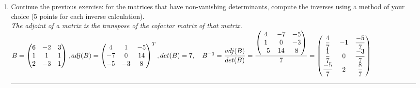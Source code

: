 \documentclass[fleqn]{article}
\begin{document}
\begin{enumerate}
  \item Continue the previous exercise: for the matrices that have non-vanishing determinants, compute the inverses using a method of your choice (5 points for each inverse calculation). 
    \textcolor{hwColor}{ \\
      \emph{The adjoint of a matrix is the transpose of the cofactor matrix of that matrix.} \\
        $
          B=\begin{pmatrix}
            6 & -2 & 3 \\ 
            1 & 1 & 1 \\ 
            2 & -3 & 1
          \end{pmatrix}
          ,
          adj(B)=
          \begin{pmatrix}
          4 & 1 & -5 \\
          -7 & 0 & 14 \\
          -5 & -3 & 8
          \end{pmatrix}^T \\
          ,
          det(B)=7, ~~~B^{-1}= \dfrac{adj(B)}{det(B)}=\dfrac{
          \begin{pmatrix}
            4 & -7 & -5 \\
            1 & 0 & -3 \\
            -5 & 14 & 8
          \end{pmatrix}
        }{7}=
        \begin{pmatrix}
          \dfrac{4}{7} & -1 & \dfrac{-5}{7} \\
          \dfrac{1}{7} & 0 & \dfrac{-3}{7} \\
          \dfrac{-5}{7} & 2 & \dfrac{8}{7}
        \end{pmatrix}
      $
    }

    \rule{16cm}{0.4pt}


\end{enumerate}
\end{document}
